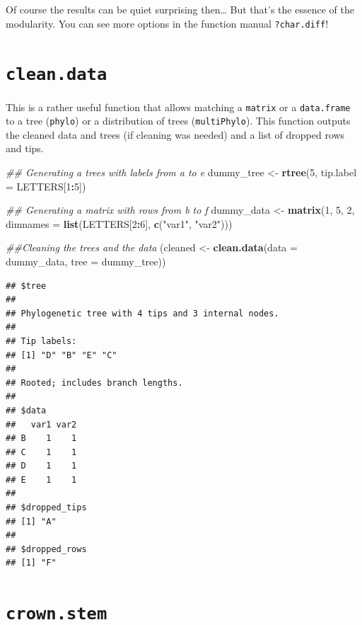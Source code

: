 \documentclass[]{book}
\newenvironment{Shaded}{\begin{snugshade}}{\end{snugshade}}
\newcommand{\CommentTok}[1]{\textcolor[rgb]{0.56,0.35,0.01}{\textit{#1}}}
\newcommand{\DataTypeTok}[1]{\textcolor[rgb]{0.13,0.29,0.53}{#1}}
\newcommand{\DecValTok}[1]{\textcolor[rgb]{0.00,0.00,0.81}{#1}}
\newcommand{\KeywordTok}[1]{\textcolor[rgb]{0.13,0.29,0.53}{\textbf{#1}}}
\newcommand{\NormalTok}[1]{#1}
\newcommand{\OperatorTok}[1]{\textcolor[rgb]{0.81,0.36,0.00}{\textbf{#1}}}
\newcommand{\StringTok}[1]{\textcolor[rgb]{0.31,0.60,0.02}{#1}}
\begin{document}
Of course the results can be quiet surprising then\ldots{} But that's the essence of the modularity. You can see more options in the function manual \texttt{?char.diff}!

\hypertarget{clean.data}{%
\section{\texorpdfstring{\texttt{clean.data}}{clean.data}}\label{clean.data}}

This is a rather useful function that allows matching a \texttt{matrix} or a \texttt{data.frame} to a tree (\texttt{phylo}) or a distribution of trees (\texttt{multiPhylo}).
This function outputs the cleaned data and trees (if cleaning was needed) and a list of dropped rows and tips.

\begin{Shaded}
\begin{Highlighting}[]
\CommentTok{## Generating a trees with labels from a to e}
\NormalTok{dummy_tree <-}\StringTok{ }\KeywordTok{rtree}\NormalTok{(}\DecValTok{5}\NormalTok{, }\DataTypeTok{tip.label =}\NormalTok{ LETTERS[}\DecValTok{1}\OperatorTok{:}\DecValTok{5}\NormalTok{])}

\CommentTok{## Generating a matrix with rows from b to f}
\NormalTok{dummy_data <-}\StringTok{ }\KeywordTok{matrix}\NormalTok{(}\DecValTok{1}\NormalTok{, }\DecValTok{5}\NormalTok{, }\DecValTok{2}\NormalTok{, }\DataTypeTok{dimnames =} \KeywordTok{list}\NormalTok{(LETTERS[}\DecValTok{2}\OperatorTok{:}\DecValTok{6}\NormalTok{], }\KeywordTok{c}\NormalTok{(}\StringTok{"var1"}\NormalTok{, }\StringTok{"var2"}\NormalTok{)))}

\CommentTok{##Cleaning the trees and the data}
\NormalTok{(cleaned <-}\StringTok{ }\KeywordTok{clean.data}\NormalTok{(}\DataTypeTok{data =}\NormalTok{ dummy_data, }\DataTypeTok{tree =}\NormalTok{ dummy_tree))}
\end{Highlighting}
\end{Shaded}

\begin{verbatim}
## $tree
## 
## Phylogenetic tree with 4 tips and 3 internal nodes.
## 
## Tip labels:
## [1] "D" "B" "E" "C"
## 
## Rooted; includes branch lengths.
## 
## $data
##   var1 var2
## B    1    1
## C    1    1
## D    1    1
## E    1    1
## 
## $dropped_tips
## [1] "A"
## 
## $dropped_rows
## [1] "F"
\end{verbatim}

\hypertarget{crown.stem}{%
\section{\texorpdfstring{\texttt{crown.stem}}{crown.stem}}\label{crown.stem}}
\end{document}
